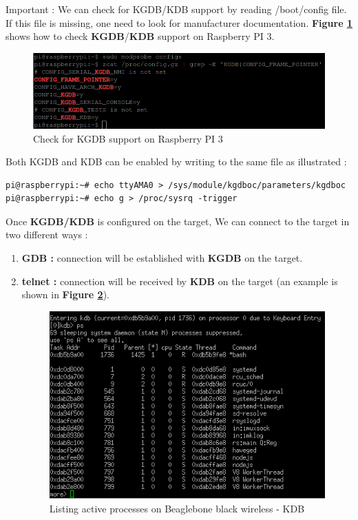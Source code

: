 Important : We can check for KGDB/KDB support by reading /boot/config file. If this file is missing, one need to look for manufacturer documentation. \textbf{Figure \ref{Check for KGDB support on Raspberry PI 3}} shows how to check \textbf{KGDB}/\textbf{KDB} support on Raspberry PI 3.
\begin{figure}[H]
		\centering
        \includegraphics[scale=0.35]{img/solution/kgdb-support-raspberry-pi-3.png}
        \caption{Check for KGDB support on Raspberry PI 3}
        \label{Check for KGDB support on Raspberry PI 3}
\end{figure}

 

Both KGDB and KDB can be enabled by writing to the same file as illustrated :
\begin{lstlisting}[style=BashInputStyle]
pi@raspberrypi:~# echo ttyAMA0 > /sys/module/kgdboc/parameters/kgdboc
pi@raspberrypi:~# echo g > /proc/sysrq -trigger
\end{lstlisting}


Once \textbf{KGDB/KDB} is configured on the target, We can connect to the target in two different ways :

\begin{enumerate}
	\item \textbf{GDB : } connection will be established with \textbf{KGDB} on the target.
	
	\item \textbf{telnet : } connection will be received by \textbf{KDB} on the target (an example is shown in \textbf{Figure \ref{Debugging Beaglebone black wireless using KDB}}).
	
	\begin{figure}[H]
		\centering
        \includegraphics[scale=0.45]{img/solution/kdb-beagle-bone-black.png}
        \caption{Listing active processes on Beaglebone black wireless - KDB}
        \label{Debugging Beaglebone black wireless using KDB}
\end{figure}
	
	
\end{enumerate}

